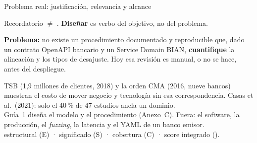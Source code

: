 \documentclass[aspectratio=169,11pt,spanish]{beamer}
\begin{document}
\begin{frame}{Problema real: justificación, relevancia y alcance}
  \begin{planreminder}{Recordatorio}
     $\neq$ . \textbf{Diseñar} es verbo del objetivo, no del problema.
  \end{planreminder}
  \vspace{0.08em}
  \begin{planstatement}
  \textbf{Problema:} no existe un procedimiento documentado y reproducible que, dado un contrato OpenAPI bancario y un Service Domain BIAN, \textbf{cuantifique} la alineación y los tipos de desajuste. Hoy esa revisión es manual, o no se hace, antes del despliegue.
  \end{planstatement}
  \vspace{0.1em}
  \begin{planpanel}
  \footnotesize
   TSB (1,9 millones de clientes, 2018) y la orden CMA (2016, nueve bancos) muestran el costo de mover negocio y tecnología sin esa correspondencia. Casas et al.\ (2021): solo el 40\,\% de 47 estudios ancla un dominio.\\[0.25em]
   Guía~1 diseña el modelo y el procedimiento (Anexo~C). Fuera: el software, la producción, el \textit{fuzzing}, la latencia y el YAML de un banco emisor.\\[0.25em]
   estructural (E) · significado (S) · cobertura (C) · score integrado (\AlignmentScore).
  \end{planpanel}
\end{frame}
\end{document}
